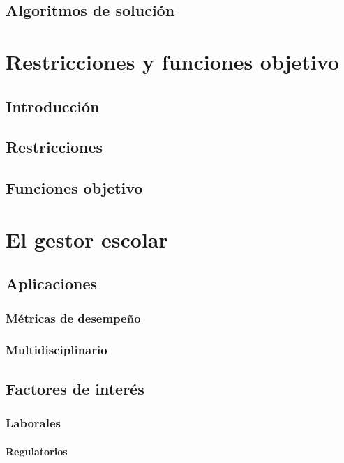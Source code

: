 \documentclass[draft,12pt,headsepline,footsepline,paper=letter]{scrreprt}
\begin{document}
\section{Algoritmos de solución}

\chapter{Restricciones y funciones objetivo}

\section{Introducción}

\section{Restricciones}

\section{Funciones objetivo}

\chapter{El gestor escolar}

\section{Aplicaciones}

\subsection{Métricas de desempeño}

\subsection{Multidisciplinario}

\section{Factores de interés}

\subsection{Laborales}

\subsubsection{Regulatorios}
\end{document}
